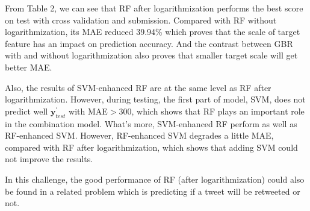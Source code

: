 From Table 2, we can see that RF after logarithmization performs the best score on test with cross validation and submission. Compared with RF without logarithmization, its MAE reduced 39.94\% which proves that the scale of target feature has an impact on prediction accuracy. And the contrast between GBR with and without logarithmization also proves that smaller target scale will get better MAE.

Also, the results of SVM-enhanced RF are at the same level as RF after logarithmization. However, during testing, the first part of model, SVM, does not predict well $\textbf{y}^{'}_{test}$ with MAE$>300$, which shows that RF plays an important role in the combination model. What's more, SVM-enhanced RF perform as well as RF-enhanced SVM. However, RF-enhanced SVM degrades a little MAE, compared with RF after logarithmization, which shows that adding SVM could not improve the results. 

In this challenge, the good performance of RF (after logarithmization) could also be found in a related problem which is predicting if a tweet will be retweeted or not\cite{rf_best}.